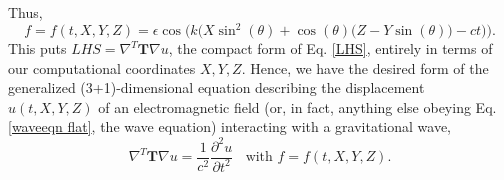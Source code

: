\documentclass{article}
\begin{document}
Thus, \begin{equation} \label{f}
f=f(t,X,Y,Z)=\epsilon \cos\big(k\big(X \sin ^2(\theta )+\cos (\theta ) \big(Z-Y \sin (\theta )\big)-ct\big)\big).
\end{equation}
This puts $LHS = \nabla^T \textbf{T} \nabla u$, the compact form of Eq. \ref{LHS}, entirely in terms of our computational coordinates $X,Y,Z$. Hence, we have the desired form of the generalized (3+1)-dimensional equation describing the displacement $u(t,X,Y,Z)$ of an electromagnetic field (or, in fact, anything else obeying Eq. \ref{waveeqn flat}, the wave equation) interacting with a gravitational wave,
\begin{equation}\label{main eqn}
\boxed{
\nabla^T \textbf{T} \nabla u = \frac{1}{c^2}\frac{\partial^2 u}{\partial t^2} \ \ \ \ \mbox{with } f=f(t,X,Y,Z).
}
\end{equation}
\end{document}
